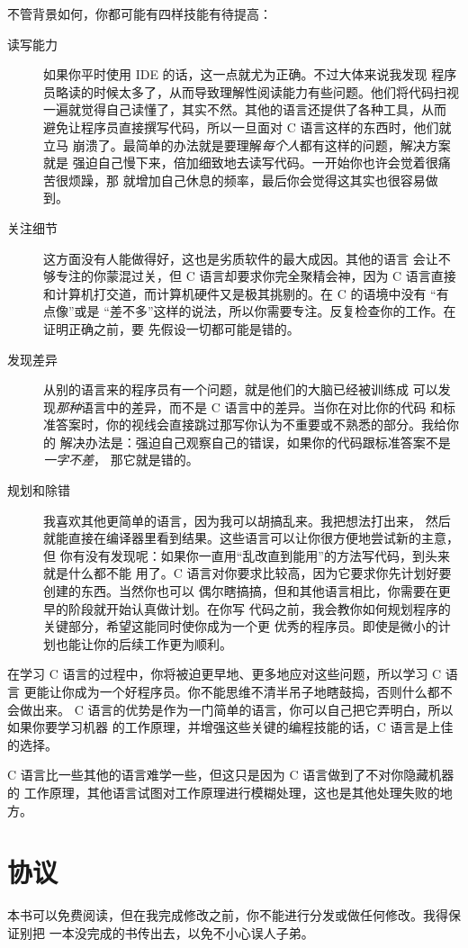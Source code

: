 不管背景如何，你都可能有四样技能有待提高：

\begin{description}

\item[读写能力] 如果你平时使用 IDE 的话，这一点就尤为正确。不过大体来说我发现
    程序员略读的时候太多了，从而导致理解性阅读能力有些问题。他们将代码扫视
    一遍就觉得自己读懂了，其实不然。其他的语言还提供了各种工具，从而
    避免让程序员直接撰写代码，所以一旦面对 C 语言这样的东西时，他们就立马
    崩溃了。最简单的办法就是要理解\emph{每个人}都有这样的问题，解决方案就是
    强迫自己慢下来，倍加细致地去读写代码。一开始你也许会觉着很痛苦很烦躁，那
    就增加自己休息的频率，最后你会觉得这其实也很容易做到。

\item[关注细节] 这方面没有人能做得好，这也是劣质软件的最大成因。其他的语言
    会让不够专注的你蒙混过关，但 C 语言却要求你完全聚精会神，因为 C 语言直接
    和计算机打交道，而计算机硬件又是极其挑剔的。在 C 的语境中没有 “有点像”或是
    “差不多”这样的说法，所以你需要专注。反复检查你的工作。在证明正确之前，要
    先假设一切都可能是错的。
    
\item[发现差异] 从别的语言来的程序员有一个问题，就是他们的大脑已经被训练成
    可以发现\emph{那种}语言中的差异，而不是 C 语言中的差异。当你在对比你的代码
    和标准答案时，你的视线会直接跳过那写你认为不重要或不熟悉的部分。我给你的
    解决办法是：强迫自己观察自己的错误，如果你的代码跟标准答案不是\emph{一字不差}，
    那它就是错的。
\item[规划和除错]  我喜欢其他更简单的语言，因为我可以胡搞乱来。我把想法打出来，
    然后就能直接在编译器里看到结果。这些语言可以让你很方便地尝试新的主意，但
    你有没有发现呢：如果你一直用“乱改直到能用”的方法写代码，到头来就是什么都不能
    用了。C 语言对你要求比较高，因为它要求你先计划好要创建的东西。当然你也可以
    偶尔瞎搞搞，但和其他语言相比，你需要在更早的阶段就开始认真做计划。在你写
    代码之前，我会教你如何规划程序的关键部分，希望这能同时使你成为一个更
    优秀的程序员。即使是微小的计划也能让你的后续工作更为顺利。
\end{description}

在学习 C 语言的过程中，你将被迫更早地、更多地应对这些问题，所以学习 C 语言
更能让你成为一个好程序员。你不能思维不清半吊子地瞎鼓捣，否则什么都不会做出来。
C 语言的优势是作为一门简单的语言，你可以自己把它弄明白，所以如果你要学习机器
的工作原理，并增强这些关键的编程技能的话，C 语言是上佳的选择。

C 语言比一些其他的语言难学一些，但这只是因为 C 语言做到了不对你隐藏机器的
工作原理，其他语言试图对工作原理进行模糊处理，这也是其他处理失败的地方。

\section*{协议}

本书可以免费阅读，但在我完成修改之前，你不能进行分发或做任何修改。我得保证别把
一本没完成的书传出去，以免不小心误人子弟。

